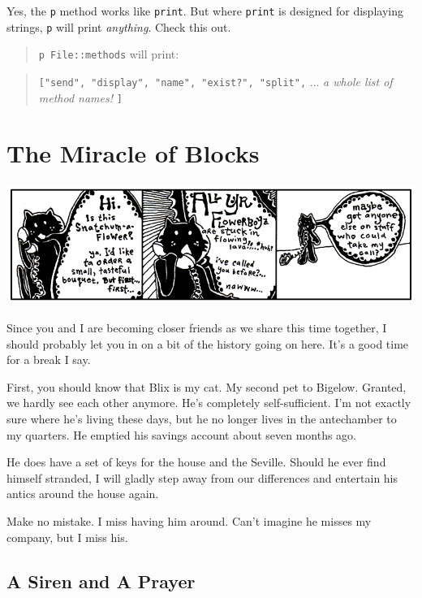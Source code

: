 \documentclass[10pt,twoside]{report}
\begin{document}
Yes, the \lstinline[breaklines=true]|p| method works like
\lstinline[breaklines=true]|print|.  But where
\lstinline[breaklines=true]|print| is designed for displaying strings,
\lstinline[breaklines=true]|p| will print {\em anything}.  Check this
out.

\begin{quote}
\lstinline[breaklines=true]|p File::methods| will print:\end{quote}


\begin{quote}
\lstinline[breaklines=true]|["send", "display", "name", "exist?", "split",|
 ... {\em a whole list of method names!}
  \lstinline[breaklines=true]|]|\end{quote}



\section{The Miracle of Blocks}


	\includegraphics[width=1.0\textwidth]{cache/30.png}

Since you and I are becoming closer friends as we share this time
together, I should probably let you in on a bit of the history going
on here.  It's a good time for a break I say.

First, you should know that Blix is my cat.  My second pet to
Bigelow. Granted, we hardly see each other anymore.  He's completely
self-sufficient. I'm not exactly sure where he's living these days,
but he no longer lives in the antechamber to my quarters.  He emptied
his savings account about seven months ago.

He does have a set of keys for the house and the Seville.  Should he
ever find himself stranded, I will gladly step away from our
differences and entertain his antics around the house again.

Make no mistake.  I miss having him around.  Can't imagine he misses
my company, but I miss his.



\subsection{A Siren and A Prayer}
\end{document}
